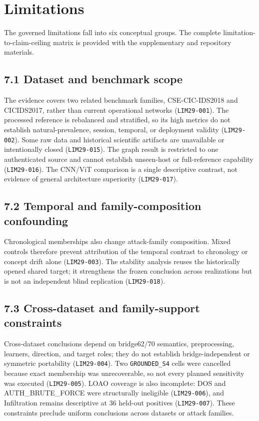 \documentclass[preprint,12pt]{elsarticle}
\begin{document}
\section{Limitations}
The governed limitations fall into six conceptual groups. The complete limitation-to-claim-ceiling matrix is provided with the supplementary and repository materials.

\subsection{7.1 Dataset and benchmark scope}
The evidence covers two related benchmark families, CSE-CIC-IDS2018 and CICIDS2017, rather than current operational networks (\texttt{LIM29-001}). The processed reference is rebalanced and stratified, so its high metrics do not establish natural-prevalence, session, temporal, or deployment validity (\texttt{LIM29-002}). Some raw data and historical scientific artifacts are unavailable or intentionally closed (\texttt{LIM29-015}). The graph result is restricted to one authenticated source and cannot establish unseen-host or full-reference capability (\texttt{LIM29-016}). The CNN/ViT comparison is a single descriptive contrast, not evidence of general architecture superiority (\texttt{LIM29-017}).

\subsection{7.2 Temporal and family-composition confounding}
Chronological memberships also change attack-family composition. Mixed controls therefore prevent attribution of the temporal contrast to chronology or concept drift alone (\texttt{LIM29-003}). The stability analysis reuses the historically opened shared target; it strengthens the frozen conclusion across realizations but is not an independent blind replication (\texttt{LIM29-018}).

\subsection{7.3 Cross-dataset and family-support constraints}
Cross-dataset conclusions depend on bridge62/70 semantics, preprocessing, learners, direction, and target roles; they do not establish bridge-independent or symmetric portability (\texttt{LIM29-004}). Two \texttt{GROUNDED\_S4} cells were cancelled because exact membership was unrecoverable, so not every planned sensitivity was executed (\texttt{LIM29-005}). LOAO coverage is also incomplete: DOS and AUTH\_BRUTE\_FORCE were structurally ineligible (\texttt{LIM29-006}), and Infiltration remains descriptive at 36 held-out positives (\texttt{LIM29-007}). These constraints preclude uniform conclusions across datasets or attack families.
\end{document}
